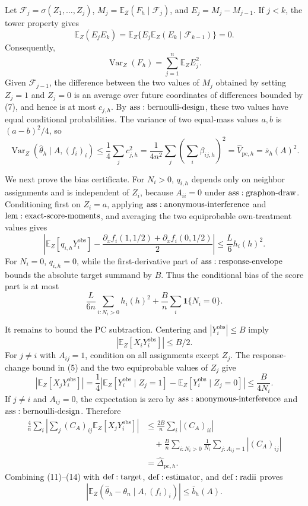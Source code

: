 Let \(\mathcal F_j=\sigma(Z_1,\ldots,Z_j)\), \(M_j=\mathbb E_Z(F_h\mid\mathcal F_j)\), and \(E_j=M_j-M_{j-1}\).  If \(j<k\), the tower property gives
\[
 \mathbb E_Z(E_jE_k)
 =\mathbb E_Z\{E_j\mathbb E_Z(E_k\mid\mathcal F_{k-1})\}=0.
\]
Consequently,
\[
 \operatorname{Var}_Z(F_h)=\sum_{j=1}^n\mathbb E_ZE_j^2.
\tag{8}
\]
Given \(\mathcal F_{j-1}\), the difference between the two values of \(M_j\) obtained by setting \(Z_j=1\) and \(Z_j=0\) is an average over future coordinates of differences bounded by (7), and hence is at most \(c_{j,h}\).  By \({\rm ass:bernoulli\text{-}design}\), these two values have equal conditional probabilities.  The variance of two equal-mass values \(a,b\) is \((a-b)^2/4\), so
\[
 \operatorname{Var}_Z(\widehat\theta_h\mid A,(f_i)_i)
 \leq\frac14\sum_jc_{j,h}^2
 =\frac1{4n^2}\sum_j\left(\sum_i\beta_{ij,h}\right)^2
 =\widehat V_{\mathrm{pc},h}
 =\overline s_h(A)^2.
\tag{9}
\]

We next prove the bias certificate.  For \(N_i>0\), \(q_{i,h}\) depends only on neighbor assignments and is independent of \(Z_i\), because \(A_{ii}=0\) under \({\rm ass:graphon\text{-}draw}\).  Conditioning first on \(Z_i=a\), applying \({\rm ass:anonymous\text{-}interference}\) and \({\rm lem:exact\text{-}score\text{-}moments}\), and averaging the two equiprobable own-treatment values gives
\[
 \left|\mathbb E_Z[q_{i,h}Y_i^{\mathrm{obs}}]
 -\frac{\partial_xf_i(1,1/2)+\partial_xf_i(0,1/2)}2\right|
 \leq\frac L6h_i(h)^2.
\tag{10}
\]
For \(N_i=0\), \(q_{i,h}=0\), while the first-derivative part of \({\rm ass:response\text{-}envelope}\) bounds the absolute target summand by \(B\).  Thus the conditional bias of the score part is at most
\[
 \frac{L}{6n}\sum_{i:N_i>0}h_i(h)^2
 +\frac Bn\sum_i\mathbf1\{N_i=0\}.
\tag{11}
\]

It remains to bound the PC subtraction.  Centering and \(|Y_i^{\mathrm{obs}}|\leq B\) imply
\[
 |\mathbb E_Z[X_iY_i^{\mathrm{obs}}]|\leq B/2.
\tag{12}
\]
For \(j\ne i\) with \(A_{ij}=1\), condition on all assignments except \(Z_j\).  The response-change bound in (5) and the two equiprobable values of \(Z_j\) give
\[
 |\mathbb E_Z[X_jY_i^{\mathrm{obs}}]|
 =\frac14\left|\mathbb E_Z[Y_i^{\mathrm{obs}}\mid Z_j=1]
 -\mathbb E_Z[Y_i^{\mathrm{obs}}\mid Z_j=0]\right|
 \leq\frac B{4N_i}.
\tag{13}
\]
If \(j\ne i\) and \(A_{ij}=0\), the expectation is zero by \({\rm ass:anonymous\text{-}interference}\) and \({\rm ass:bernoulli\text{-}design}\).  Therefore
\[
\begin{aligned}
 \frac4n\sum_i\left|\sum_j(C_A)_{ij}
       \mathbb E_Z[X_jY_i^{\mathrm{obs}}]\right|
 &\leq\frac{2B}{n}\sum_i|(C_A)_{ii}|\\
 &\quad+\frac Bn\sum_{i:N_i>0}\frac1{N_i}
       \sum_{j:A_{ij}=1}|(C_A)_{ij}|\\
 &=\widehat\Delta_{\mathrm{pc},h}.
\end{aligned}
\tag{14}
\]
Combining (11)--(14) with \({\rm def:target}\), \({\rm def:estimator}\), and \({\rm def:radii}\) proves
\[
 \left|\mathbb E_Z(\widehat\theta_h-\theta_n\mid A,(f_i)_i)\right|
 \leq\overline b_h(A).
\tag{15}
\]

